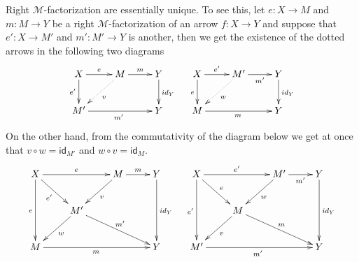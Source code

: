 \documentclass[a4paper,UKenglish,cleveref,pdftex,thm-restate,numberwithinsect]{lipics-v2021}
\newcommand{\id}[1]{\mathsf{id}_{#1}}
\begin{document}
\begin{remark}\label{rem:uniq}
	Right $\mathcal{M}$-factorization are essentially unique. To see this, let $e\colon X\to M$ and $m\colon M\to Y$ be a right $\mathcal{M}$-factorization of an arrow $f\colon X\to Y$ and suppose that  $e'\colon X\to M'$ and $m'\colon M'\to Y$ is another, then we  get the existence of the dotted arrows in the following two diagrams
	\[\xymatrix{X \ar[r]^-{e}  \ar[d]_-{e'}& M \ar[r]^-{m} \ar@{.>}[dl]^{v} & Y \ar[d]^{\id{Y}} & X \ar[r]^-{e'}  \ar[d]_{e}& M' \ar[r]_-{m'} \ar@{.>}[dl]^{w} & Y \ar[d]^{\id{Y}}\\M' \ar[rr]_{m'} && Y & M \ar[rr]_{m} && Y}\] 
	On the other hand, from the commutativity of the diagram below we get at once that $v\circ w=\id{M'}$ and $w\circ v=\id{M}$.
	\[\xymatrix{X \ar[rr]^-{e}  \ar[dr]_-{e'} \ar[dd]_{e}&& M \ar[r]^-{m} \ar[dl]^{v} & Y \ar[dd]^{\id{Y}} & X \ar[dr]^{e} \ar[rr]^-{e'}  \ar[dd]_{e'}&& M' \ar[r]_-{m'} \ar[dl]^{w} &Y \ar[dd]^{\id{Y}}\\ & M' \ar[dl]^{w}  \ar[drr]^{m'} &&&&M\ar[dl]^{v} \ar[drr]^{m}\\M \ar[rrr]_{m} &&& Y & M' \ar[rrr]_{m'} &&& Y}\] 
\end{remark}
\end{document}
